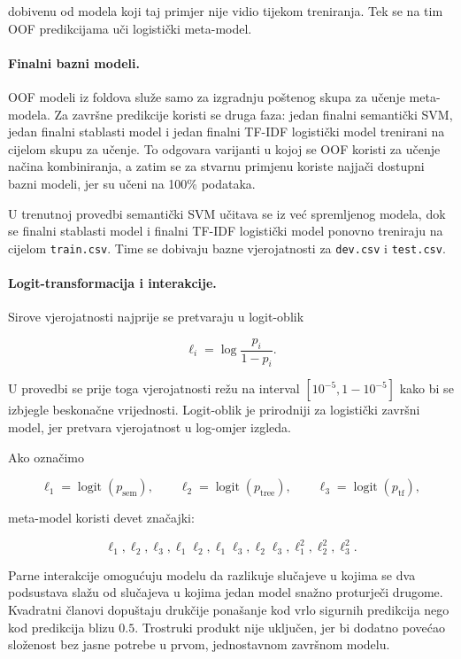 dobivenu od modela koji taj primjer nije vidio tijekom treniranja. Tek se na tim OOF predikcijama uči logistički meta-model.

\paragraph{Finalni bazni modeli.}
OOF modeli iz foldova služe samo za izgradnju poštenog skupa za učenje meta-modela. Za završne predikcije koristi se druga faza: jedan finalni semantički SVM, jedan finalni stablasti model i jedan finalni TF-IDF logistički model trenirani na cijelom skupu za učenje. To odgovara varijanti u kojoj se OOF koristi za učenje načina kombiniranja, a zatim se za stvarnu primjenu koriste najjači dostupni bazni modeli, jer su učeni na 100\% podataka.

U trenutnoj provedbi semantički SVM učitava se iz već spremljenog modela, dok se finalni stablasti model i finalni TF-IDF logistički model ponovno treniraju na cijelom \texttt{train.csv}. Time se dobivaju bazne vjerojatnosti za \texttt{dev.csv} i \texttt{test.csv}.

\paragraph{Logit-transformacija i interakcije.}
Sirove vjerojatnosti najprije se pretvaraju u logit-oblik

\[
\ell_i = \log\frac{p_i}{1-p_i}.
\]

U provedbi se prije toga vjerojatnosti režu na interval $[10^{-5},1-10^{-5}]$ kako bi se izbjegle beskonačne vrijednosti. Logit-oblik je prirodniji za logistički završni model, jer pretvara vjerojatnost u log-omjer izgleda.

Ako označimo

\[
\ell_1=\operatorname{logit}(p_{\mathrm{sem}}),
\qquad
\ell_2=\operatorname{logit}(p_{\mathrm{tree}}),
\qquad
\ell_3=\operatorname{logit}(p_{\mathrm{tf}}),
\]

meta-model koristi devet značajki:

\[
\ell_1,
\ell_2,
\ell_3,
\ell_1\ell_2,
\ell_1\ell_3,
\ell_2\ell_3,
\ell_1^2,
\ell_2^2,
\ell_3^2.
\]

Parne interakcije omogućuju modelu da razlikuje slučajeve u kojima se dva podsustava slažu od slučajeva u kojima jedan model snažno proturječi drugome. Kvadratni članovi dopuštaju drukčije ponašanje kod vrlo sigurnih predikcija nego kod predikcija blizu $0.5$. Trostruki produkt nije uključen, jer bi dodatno povećao složenost bez jasne potrebe u prvom, jednostavnom završnom modelu.

